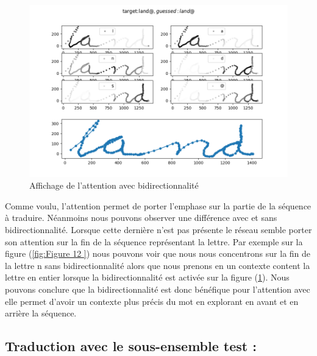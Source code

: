     \begin{figure}[!ht]
        \centering
        \includegraphics[width=120mm]{sections/images/interpretation/bidirtest2.png}
        \caption{Affichage de l'attention avec bidirectionnalité}
        \label{fig:Figure 13  }
    \end{figure}
     Comme voulu, l'attention permet de porter l'emphase sur la partie de la séquence à traduire. Néanmoins nous pouvons observer une différence avec et sans bidirectionnalité. Lorsque cette dernière n'est pas présente le réseau semble porter son attention sur la fin de la séquence représentant la lettre. Par exemple sur la figure (\ref{fig:Figure 12  }) nous pouvons voir que nous nous concentrons sur la fin de la lettre n sans bidirectionnalité alors que nous prenons en un contexte content la lettre en entier lorsque la bidirectionnalité est activée sur la figure (\ref{fig:Figure 13  }). Nous pouvons conclure que la bidirectionnalité est donc bénéfique pour l'attention avec elle permet d'avoir un contexte plus précis du mot en explorant en avant et en arrière la séquence.
    
    
    

\subsection{Traduction avec le sous-ensemble test :}


